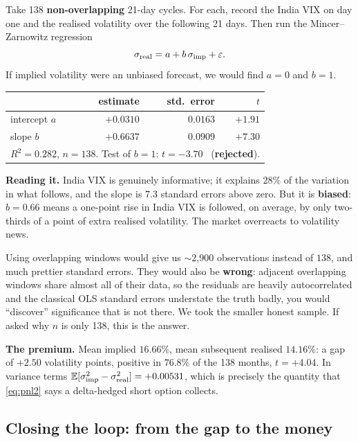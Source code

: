 \documentclass[11pt,a4paper]{article}
\begin{document}
Take 138 \textbf{non-overlapping} 21-day cycles. For each, record the India VIX on day one and
the realised volatility over the following 21 days. Then run the Mincer--Zarnowitz regression
\[
\sigma_{\mathrm{real}}=a+b\,\sigma_{\mathrm{imp}}+\varepsilon .
\]
If implied volatility were an unbiased forecast, we would find $a=0$ and $b=1$.

\begin{table}[H]
\centering\small
\begin{tabular}{lrrr}
\toprule
 & estimate & std.\ error & $t$ \\
\midrule
intercept $a$ & $+0.0310$ & $0.0163$ & $+1.91$ \\
slope $b$     & $+0.6637$ & $0.0909$ & $+7.30$ \\
\midrule
\multicolumn{4}{l}{$R^2=0.282$, $n=138$. Test of $b=1$: $t=-3.70$ \ (\textbf{rejected}).} \\
\bottomrule
\end{tabular}
\end{table}

\textbf{Reading it.} India VIX is genuinely informative; it explains $28\%$ of the variation
in what follows, and the slope is $7.3$ standard errors above zero. But it is \textbf{biased}:
$b=0.66$ means a one-point rise in India VIX is followed, on average, by only two-thirds of a
point of extra realised volatility. The market overreacts to volatility news.

\begin{whybox}
Using overlapping windows would give us $\sim$2{,}900 observations instead of $138$, and much
prettier standard errors. They would also be \textbf{wrong}: adjacent overlapping windows share
almost all of their data, so the residuals are heavily autocorrelated and the classical OLS
standard errors understate the truth badly, you would ``discover'' significance that is not
there. We took the smaller honest sample. If asked why $n$ is only 138, this is the answer.
\end{whybox}

\textbf{The premium.} Mean implied $16.66\%$, mean subsequent realised $14.16\%$: a gap of
$\mathbf{+2.50}$ volatility points, positive in $76.8\%$ of the 138 months, $t=+4.04$. In
variance terms $\mathbb{E}[\sigma_{\mathrm{imp}}^2-\sigma_{\mathrm{real}}^2]=+0.00531$, which is precisely the quantity that
\eqref{eq:pnl2} says a delta-hedged short option collects.

\subsection{Closing the loop: from the gap to the money}
\end{document}
